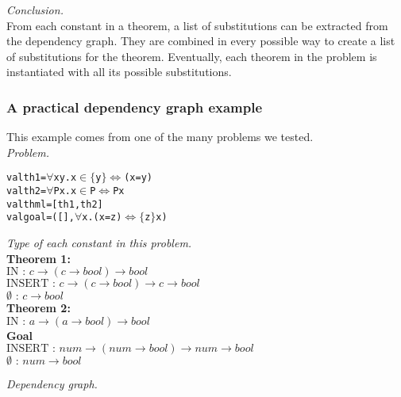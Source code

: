 \documentclass[a4paper, 11pt]{article}
\theoremstyle{plain}
\theoremstyle{definition}
\theoremstyle{remark}
\begin{document}
  
\noindent \textit{Conclusion.}
\\From each constant in a theorem, a list of substitutions can be extracted from the dependency graph. They are combined in every possible way to create a list of substitutions for the theorem. Eventually, each theorem in the problem is instantiated with all its possible substitutions.

\subsubsection{A practical dependency graph example}
This example comes from one of the many problems we tested.
\vspace{2mm}
\\ \textit{Problem.}
\scriptsize
\begin{alltt}
val th1 = \(\forall\) x y. x \(\in \lbrace\) y \(\rbrace \iff\) (x = y)
val th2 = \(\forall\) P x. x \(\in\) P \(\iff\) P x
val thml = [th1,th2]
val goal = ([], \(\forall\) x. (x = z) \(\iff \lbrace\) z \(\rbrace\) x)
\end{alltt} 
\normalsize

\vspace{2mm}
\begin{minipage}{\textwidth}
\noindent \textit{Type of each constant in this problem.}
\scriptsize
\\ \textbf{Theorem 1:} \\
  $\mbox{IN : }c \rightarrow (c \rightarrow bool) \rightarrow 
bool$ \\
  $ \mbox{INSERT : }c \rightarrow (c \rightarrow bool) \rightarrow c \rightarrow bool$ \\
  $ \emptyset \mbox{ : }c \rightarrow bool$\\ 
  \textbf{Theorem 2:} \\
  $\mbox{IN : }a \rightarrow (a \rightarrow bool) \rightarrow bool$\\
  \textbf{Goal}\\  
  $\mbox{INSERT : } num \rightarrow (num \rightarrow bool)   \rightarrow num \rightarrow bool$ \\
  $\emptyset\mbox{ : } num \rightarrow bool$\\
\normalsize
\end{minipage}
\vspace{5mm}
\noindent \textit{Dependency graph.}
\end{document}
